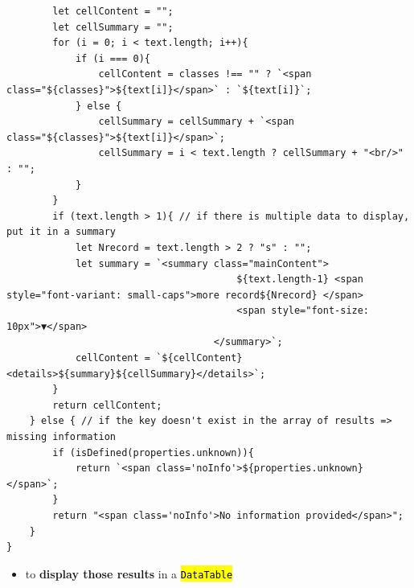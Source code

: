 \documentclass[a4paper,12pt,twoside]{book}
\let\OldTexttt\texttt
\renewcommand{\texttt}[1]{\OldTexttt{\hl{#1}}}
\begin{document}
\begin{lstlisting}
        let cellContent = "";
        let cellSummary = "";
        for (i = 0; i < text.length; i++){
            if (i === 0){
                cellContent = classes !== "" ? `<span class="${classes}">${text[i]}</span>` : `${text[i]}`;
            } else {
                cellSummary = cellSummary + `<span class="${classes}">${text[i]}</span>`;
                cellSummary = i < text.length ? cellSummary + "<br/>" : "";
            }
        }
        if (text.length > 1){ // if there is multiple data to display, put it in a summary
            let Nrecord = text.length > 2 ? "s" : "";
            let summary = `<summary class="mainContent">
                                        ${text.length-1} <span style="font-variant: small-caps">more record${Nrecord} </span>
                                        <span style="font-size: 10px">▼</span>
                                    </summary>`;
            cellContent = `${cellContent}<details>${summary}${cellSummary}</details>`;
        }
        return cellContent;
    } else { // if the key doesn't exist in the array of results => missing information
        if (isDefined(properties.unknown)){
            return `<span class='noInfo'>${properties.unknown}</span>`;
        }
        return "<span class='noInfo'>No information provided</span>";
    }
}
\end{lstlisting}

\begin{itemize}
	\item to \textbf{display those results} in a \texttt{DataTable}
\end{itemize}
\end{document}
